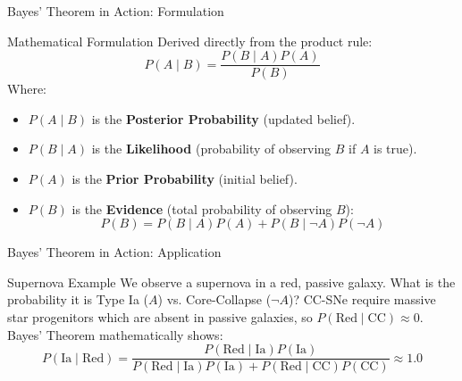 \documentclass[9pt]{beamer}
\begin{document}
\begin{frame}{Bayes' Theorem in Action: Formulation}
  \begin{block}{Mathematical Formulation}
    Derived directly from the product rule:
    $$P(A \mid B) = \frac{P(B \mid A)P(A)}{P(B)}$$
    Where:
    \begin{itemize}
      \item $P(A \mid B)$ is the \textbf{Posterior Probability} (updated belief).
      \item $P(B \mid A)$ is the \textbf{Likelihood} (probability of observing $B$ if $A$ is true).
      \item $P(A)$ is the \textbf{Prior Probability} (initial belief).
      \item $P(B)$ is the \textbf{Evidence} (total probability of observing $B$):
        $$P(B) = P(B \mid A)P(A) + P(B \mid \neg A)P(\neg A)$$
    \end{itemize}
  \end{block}
\end{frame}

\begin{frame}{Bayes' Theorem in Action: Application}
  \begin{exampleblock}{Supernova Example}
    We observe a supernova in a red, passive galaxy. What is the probability it is Type Ia ($A$) vs. Core-Collapse ($\neg A$)?
    CC-SNe require massive star progenitors which are absent in passive galaxies, so $P(\text{Red} \mid \text{CC}) \approx 0$.
    Bayes' Theorem mathematically shows:
    $$P(\text{Ia} \mid \text{Red}) = \frac{P(\text{Red} \mid \text{Ia})P(\text{Ia})}{P(\text{Red} \mid \text{Ia})P(\text{Ia}) + P(\text{Red} \mid \text{CC})P(\text{CC})} \approx 1.0$$
  \end{exampleblock}
\end{frame}
\end{document}
